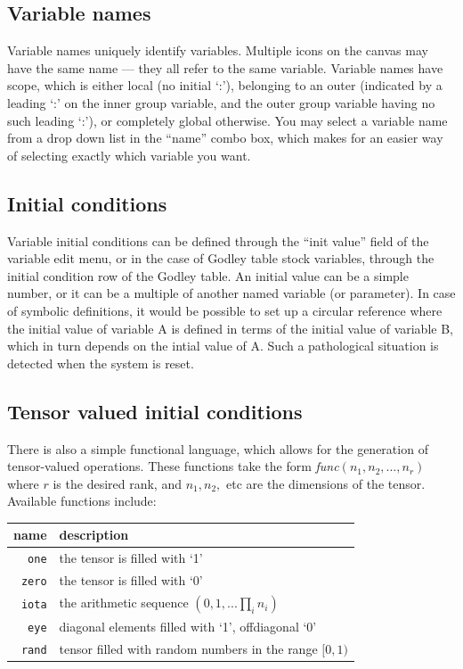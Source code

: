 \subsection{Variable names}

Variable names uniquely identify variables. Multiple icons on the
canvas may have the same name --- they all refer to the same
variable. Variable names have scope, which is either local (no initial
`:'), belonging to an outer  (indicated by a
leading `:' on the inner group variable, and the outer group variable
having no such leading `:'), or completely global otherwise. You may
select a variable name from a drop down list in the ``name'' combo
box, which makes for an easier way of selecting exactly which variable
you want.

\subsection{Initial conditions}\label{var:init}

Variable initial conditions can be defined through the ``init value''
field of the variable edit menu, or in the case of Godley table stock
variables, through the initial condition row of the Godley table. An
initial value can be a simple number, or it can be a multiple of
another named variable (or parameter). In case of symbolic
definitions, it would be possible to set up a circular reference where
the initial value of variable A is defined in terms of the initial
value of variable B, which in turn depends on the intial value of
A. Such a pathological situation is detected when the system is reset.

\subsection{Tensor valued initial
  conditions}\label{tensor-init}

There is also a simple functional language, which allows for the
generation of tensor-valued operations. These functions take the form
{\em func}$(n_1,n_2,\ldots,n_r)$ where $r$ is the desired rank, and
$n_1,n_2,$ etc are the dimensions of the tensor. Available functions
include:

\begin{tabular}{|r|l|}
  \hline
  name & description\\\hline
  \verb+one+ & the tensor is filled with `1'\\
  \verb+zero+ & the tensor is filled with `0'\\
  \verb+iota+ & the arithmetic sequence $(0,1,...\prod_in_i)$\\
  \verb+eye+ & diagonal elements filled with `1', offdiagonal `0'\\
  \verb+rand+ & tensor filled with random numbers in the range $[0,1)$\\
  \hline
\end{tabular}


